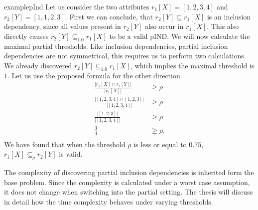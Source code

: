 \begin{restatable}{example}{pInd}\label{exmp:pInd}
    Let us consider the two attributes $r_1[X] = [1, 2, 3, 4]$ and $r_2[Y] = [1, 1, 2, 3]$. First we can conclude, that $r_2[Y] \subseteq r_1[X]$ is an inclusion dependency, since all values present in $r_2[Y]$ also occur in $r_1[X]$. This also directly causes $r_2[Y] \subseteq_{1.0} r_1[X]$ to be a valid pIND. We will now calculate the maximal partial thresholds. Like inclusion dependencies, partial inclusion dependencies are not symmetrical, this requires us to perform two calculations. We already discovered $r_2[Y] \subseteq_{1.0} r_1[X]$, which implies the maximal threshold is $1$. Let us use the proposed formula for the other direction.
    \begin{align*}
        \frac{|r_1[X] \cap r_2[Y]|}
            {|r_1[X]|} & \geq \rho \\
        \frac{|[1, 2, 3, 4] \cap [1, 2, 3]|}
            {|[1, 2, 3, 4]|} & \geq \rho \\ 
        \frac{|[1, 2, 3]|}
            {|[1, 2, 3, 4]|} & \geq \rho \\
        \frac{3}{4} & \geq \rho. \\ 
    \end{align*}
    We have found that when the threshold $\rho$ is less or equal to $0.75$, $r_1[X] \subseteq_{\rho} r_2[Y]$ is valid.
\end{restatable}

\noindent The complexity of discovering partial inclusion dependencies is inherited form the base problem. Since the complexity is calculated under a worst case assumption, it does not change when switching into the partial setting. The thesis will discuss in detail how the time complexity behaves under varying thresholds.

